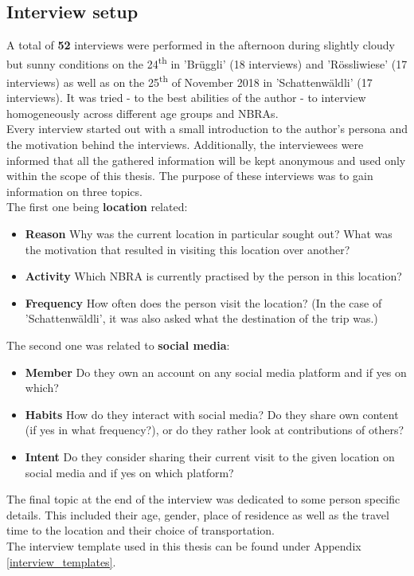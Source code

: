 \subsection{Interview setup} \label{interview_setup}
A total of \textbf{52} interviews were performed in the afternoon during slightly cloudy but sunny conditions on the 24\textsuperscript{th} in 'Br\"uggli' (18 interviews) and 'R\"ossliwiese' (17 interviews) as well as on the 25\textsuperscript{th} of November 2018 in 'Schattenw\"aldli' (17 interviews). It was tried - to the best abilities of the author - to interview homogeneously across different age groups and NBRAs.\\
Every interview started out with a small introduction to the author's persona and the motivation behind the interviews. Additionally, the interviewees were informed that all the gathered information will be kept anonymous and used only within the scope of this thesis. The purpose of these interviews was to gain information on three topics.\\
\newline
The first one being \textbf{location} related:
\begin{itemize}[label={}]
    \item \textbf{Reason} Why was the current location in particular sought out? What was the motivation that resulted in visiting this location over another?
    \item \textbf{Activity} Which NBRA is currently practised by the person in this location?
    \item \textbf{Frequency} How often does the person visit the location? (In the case of 'Schattenw\"aldli', it was also asked what the destination of the trip was.)
\end{itemize}

The second one was related to \textbf{social media}:
\begin{itemize}[label={}]
    \item \textbf{Member} Do they own an account on any social media platform and if yes on which?
    \item \textbf{Habits} How do they interact with social media? Do they share own content (if yes in what frequency?), or do they rather look at contributions of others?
    \item \textbf{Intent} Do they consider sharing their current visit to the given location on social media and if yes on which platform?
\end{itemize}
The final topic at the end of the interview was dedicated to some person specific details. This included their age, gender, place of residence as well as the travel time to the location and their choice of transportation.\\
The interview template used in this thesis can be found under Appendix \ref{interview_templates}.
















